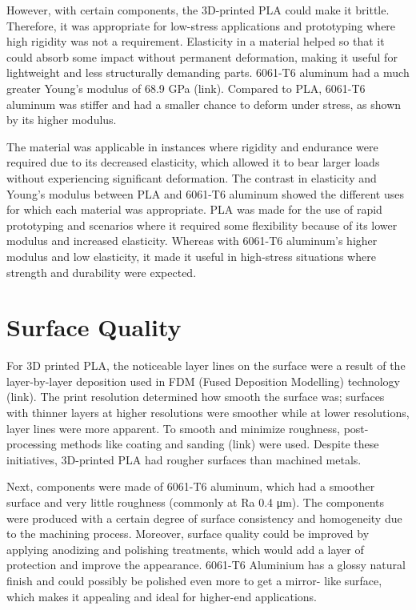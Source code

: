     However, with certain components, the 3D-printed PLA could make it brittle. Therefore, it was appropriate
    for low-stress applications and prototyping where high rigidity was not a requirement. Elasticity in a
    material helped so that it could absorb some impact without permanent deformation, making it useful for
    lightweight and less structurally demanding parts.
    6061-T6 aluminum had a much greater Young's modulus of 68.9 GPa (link). Compared to PLA, 6061-T6
    aluminum was stiffer and had a smaller chance to deform under stress, as shown by its higher modulus.

    The material was applicable in instances where rigidity and endurance were required due to its
    decreased elasticity, which allowed it to bear larger loads without experiencing significant deformation.
    The contrast in elasticity and Young's modulus between PLA and 6061-T6 aluminum showed the different
    uses for which each material was appropriate. PLA was made for the use of rapid prototyping and
    scenarios where it required some flexibility because of its lower modulus and increased elasticity.
    Whereas with 6061-T6 aluminum's higher modulus and low elasticity, it made it useful in high-stress
    situations where strength and durability were expected.

\section{Surface Quality}

    For 3D printed PLA, the noticeable layer lines on the surface were a result of the layer-by-layer
    deposition used in FDM (Fused Deposition Modelling) technology (link). The print resolution determined
    how smooth the surface was; surfaces with thinner layers at higher resolutions were smoother while at
    lower resolutions, layer lines were more apparent. To smooth and minimize roughness, post-processing
    methods like coating and sanding (link) were used. Despite these initiatives, 3D-printed PLA had rougher
    surfaces than machined metals.


    Next, components were made of 6061-T6 aluminum, which had a smoother surface and very little roughness
    (commonly at Ra 0.4 μm). The components were produced with a certain degree of surface consistency
    and homogeneity due to the machining process. Moreover, surface quality could be improved by applying
    anodizing and polishing treatments, which would add a layer of protection and improve the appearance.
    6061-T6 Aluminium has a glossy natural finish and could possibly be polished even more to get a mirror-
    like surface, which makes it appealing and ideal for higher-end applications.

